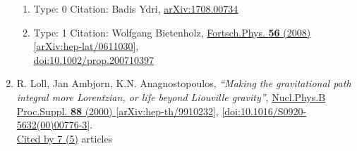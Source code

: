 \documentclass[a4paper,10pt]{article}
\begin{document}
\begin{enumerate}
\begin{enumerate}
  \item Type: 0 Citation: Badis Ydri, \href{https://arxiv.org/abs/1708.00734}{arXiv:1708.00734}
  \item Type: 1 Citation: Wolfgang Bietenholz, \href{https://www.doi.org/10.1002/prop.200710397}{Fortsch.Phys. {\bf 56} (2008) }  \href{https://arxiv.org/abs/hep-lat/0611030}{[arXiv:hep-lat/0611030]},\\\href{https://www.doi.org/10.1002/prop.200710397}{doi:10.1002/prop.200710397}
\end{enumerate}
\item R. Loll, Jan Ambjorn, K.N. Anagnostopoulos, {\it ``Making the gravitational path integral more Lorentzian, or life beyond Liouville gravity''}, \href{https://www.doi.org/10.1016/S0920-5632(00)00776-3}{Nucl.Phys.B Proc.Suppl. {\bf 88} (2000) } \href{https://arxiv.org/abs/hep-th/9910232}{[arXiv:hep-th/9910232]}, \href{https://www.doi.org/10.1016/S0920-5632(00)00776-3}{[doi:10.1016/S0920-5632(00)00776-3]}.
\\\href{https://inspirehep.net/literature/?q=refersto%3Arecid%3A509292}{Cited by 7 (5)} articles


\end{enumerate}
\end{document}
